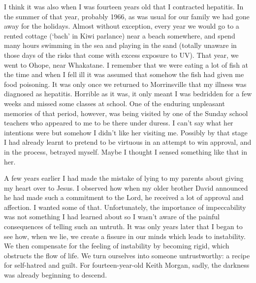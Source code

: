 I think it was also when I was fourteen years old that I contracted
hepatitis. In the summer of that year, probably 1966, as was usual for
our family we had gone away for the holidays. Almost without exception,
every year we would go to a rented cottage (`bach' in Kiwi parlance)
near a beach somewhere, and spend many hours swimming in the sea and
playing in the sand (totally unaware in those days of the risks that
come with excess exposure to UV). That year, we went to Ohope, near
Whakatane. I remember that we were eating a lot of fish at the time and
when I fell ill it was assumed that somehow the fish had given me food
poisoning. It was only once we returned to Morrinsville that my illness
was diagnosed as hepatitis. Horrible as it was, it only meant I was
bedridden for a few weeks and missed some classes at school. One of the
enduring unpleasant memories of that period, however, was being visited
by one of the Sunday school teachers who appeared to me to be there
under duress. I can't say what her intentions were but somehow I didn't
like her visiting me. Possibly by that stage I had already learnt to
pretend to be virtuous in an attempt to win approval, and in the
process, betrayed myself. Maybe I thought I sensed something like that
in her.

A few years earlier I had made the mistake of lying to my parents about
giving my heart over to Jesus. I observed how when my older brother
David announced he had made such a commitment to the Lord, he received a
lot of approval and affection. I wanted some of that. Unfortunately, the
importance of impeccability was not something I had learned about so I
wasn't aware of the painful consequences of telling such an untruth. It
was only years later that I began to see how, when we lie, we create a
fissure in our minds which leads to instability. We then compensate for
the feeling of instability by becoming rigid, which obstructs the flow
of life. We turn ourselves into someone untrustworthy: a recipe for
self-hatred and guilt. For fourteen-year-old Keith Morgan, sadly, the
darkness was already beginning to descend.

